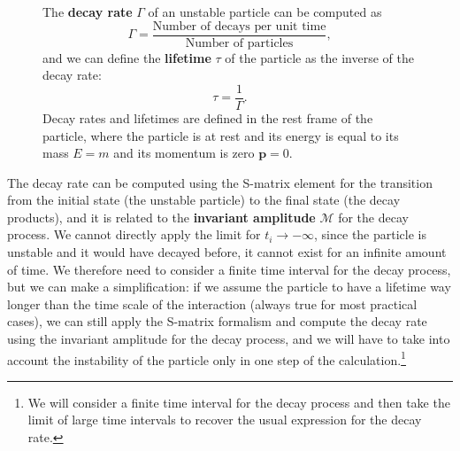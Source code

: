 \begin{figure}[H]
    \begin{minipage}{0.3\textwidth}
        \centering
    \end{minipage}
    \hfill
    \begin{minipage}{0.65\textwidth}
        The \textbf{decay rate} \(\Gamma\) of an unstable particle can be computed as
        \[
            \Gamma = \frac{\text{Number of decays per unit time}}{\text{Number of particles}},
        \]
        and we can define the \textbf{lifetime} \(\tau\) of the particle as the inverse of the decay rate:
        \[
            \tau = \frac{1}{\Gamma}.
        \]
        Decay rates and lifetimes are defined in the rest frame of the particle, where the particle is at rest and its energy is equal to its mass \(E = m\) and its momentum is zero \(\mathbf{p} = 0\).
    \end{minipage}
\end{figure}
The decay rate can be computed using the S-matrix element for the transition from the initial state (the unstable particle) to the final state (the decay products), and it is related to the \textbf{invariant amplitude} \(\mathcal{M}\) for the decay process.
We cannot directly apply the limit for \(t_i \to -\infty\), since the particle is unstable and it would have decayed before, it cannot exist for an infinite amount of time. We therefore need to consider a finite time interval for the decay process, but we can make a simplification: if we assume the particle to have a lifetime way longer than the time scale of the interaction (always true for most practical cases), we can still apply the S-matrix formalism and compute the decay rate using the invariant amplitude for the decay process, and we will have to take into account the instability of the particle only in one step of the calculation.\footnote{We will consider a finite time interval for the decay process and then take the limit of large time intervals to recover the usual expression for the decay rate.}

